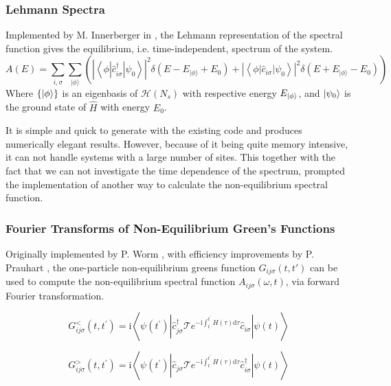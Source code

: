 \subsubsection{Lehmann Spectra}
Implemented by M. Innerberger in \cite{innerberger}, the Lehmann representation of the spectral function gives the equilibrium, i.e. time-independent, spectrum of the system. 
\begin{equation}
    A(E)=\sum_{i, \sigma} \sum_{|\phi\rangle}\left(\left|\left\langle\phi\left|\hat{c}_{i \sigma}^{\dagger}\right| \psi_{0}\right\rangle\right|^{2} \delta\left(E-E_{|\phi\rangle}+E_{0}\right)+\left|\left\langle\phi\left|\hat{c}_{i \sigma}\right| \psi_{0}\right\rangle\right|^{2} \delta\left(E+E_{|\phi\rangle}-E_{0}\right)\right)
\end{equation}
Where $\{ \ket{\phi}\}$ is an eigenbasis of $\mathcal{H}(N_s)$ with respective energy $E_{\ket{\phi}}$, and $\ket{\psi_0}$ is the ground state of $\hat{H}$ with energy $E_0$.

\bigskip
It is simple and quick to generate with the existing code and produces numerically elegant results. However, because of it being quite memory intensive, it can not handle systems with a large number of sites. This together with the fact that we can not investigate the time dependence of the spectrum, prompted the implementation of another way to calculate the non-equilibrium spectral function.

\subsubsection{Fourier Transforms of Non-Equilibrium Green's Functions}

Originally implemented by P. Worm \cite{worm_bachelor}, with efficiency improvements by P. Prauhart \cite{prauhart}, the one-particle non-equilibrium greens function $G_{ij\sigma} (t,t')$ can be used to compute the non-equilibrium spectral function $A_{ij\sigma}(\omega, t)$, via forward Fourier transformation.

\begin{equation}
    G_{i j \sigma}^{<}\left(t, t^{\prime}\right)=\mathrm{i}\left\langle\psi\left(t^{\prime}\right)\left|\hat{c}_{j \sigma}^{\dagger} \mathcal{T} e^{-\mathrm{i} \int_{t}^{t^{\prime}} H(\tau) \mathrm{d} \tau} \hat{c}_{i \sigma}\right| \psi(t)\right\rangle\label{eq:greens_function_lesser}
\end{equation}

\begin{equation}
    G_{i j \sigma}^{>}\left(t, t^{\prime}\right)=\mathrm{i}\left\langle\psi\left(t^{\prime}\right)\left|\hat{c}_{j \sigma} \mathcal{T} e^{-\mathrm{i} \int_{t}^{t^{\prime}} H(\tau) \mathrm{d} \tau} \hat{c}_{i \sigma}^\dagger\right| \psi(t)\right\rangle\label{eq:greens_function_greater}
\end{equation}

